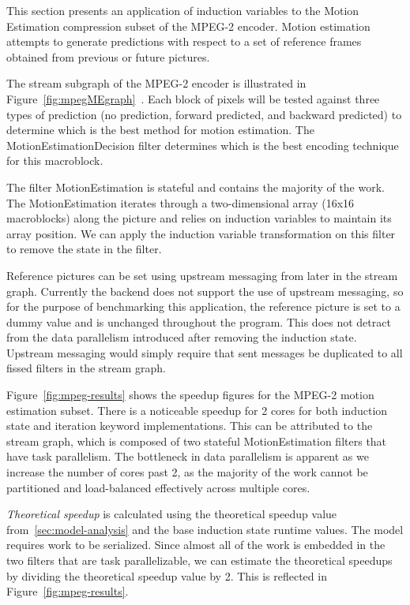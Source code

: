 This section presents an application of induction variables to the Motion Estimation compression subset of the MPEG-2 encoder.  Motion estimation attempts to generate predictions with respect to a set of reference frames obtained from previous or future pictures.  

The stream subgraph of the MPEG-2 encoder is illustrated in Figure~\ref{fig:mpegMEgraph}~\cite{drake-thesis}.  Each block of pixels will be tested against three types of prediction (no prediction, forward predicted, and backward predicted) to determine which is the best method for motion estimation.  The MotionEstimationDecision filter determines which is the best encoding technique for this macroblock.

The filter MotionEstimation is stateful and contains the majority of the work.  The MotionEstimation iterates through a two-dimensional array (16x16 macroblocks) along the picture and relies on induction variables to maintain its array position.  We can apply the induction variable transformation on this filter to remove the state in the filter.

Reference pictures can be set using upstream messaging from later in the stream graph.  Currently the backend does not support the use of upstream messaging, so for the purpose of benchmarking this application, the reference picture is set to a dummy value and is unchanged throughout the program.  This does not detract from the data parallelism introduced after removing the induction state.  Upstream messaging would simply require that sent messages be duplicated to all fissed filters in the stream graph.

Figure~\ref{fig:mpeg-results} shows the speedup figures for the MPEG-2 motion estimation subset.  There is a noticeable speedup for 2 cores for both induction state and iteration keyword implementations.  This can be attributed to the stream graph, which is composed of two stateful MotionEstimation filters that have task parallelism.  The bottleneck in data parallelism is apparent as we increase the number of cores past 2, as the majority of the work cannot be partitioned and load-balanced effectively across multiple cores.  

{\it Theoretical speedup} is calculated using the theoretical speedup value from~\ref{sec:model-analysis} and the base induction state runtime values.  The model requires work to be serialized.  Since almost all of the work is embedded in the two filters that are task parallelizable, we can estimate the theoretical speedups by dividing the theoretical speedup value by 2.  This is reflected in Figure~\ref{fig:mpeg-results}.

